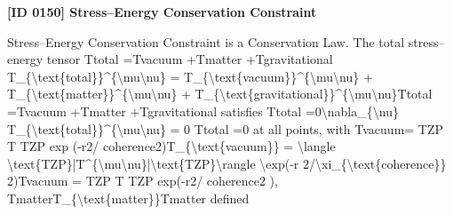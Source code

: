 \clearpage
\noindent\textbf{[ID 0150] Stress--Energy Conservation Constraint}\par
\vspace{0.35em}
\begingroup\small
{}
Stress--Energy Conservation Constraint is a Conservation Law. The total stress--energy tensor Ttotal  =Tvacuum  +Tmatter  +Tgravitational  T\_\{\textbackslash{}text\{total\}\}\textasciicircum{}\{\textbackslash{}mu\textbackslash{}nu\} = T\_\{\textbackslash{}text\{vacuum\}\}\textasciicircum{}\{\textbackslash{}mu\textbackslash{}nu\} + T\_\{\textbackslash{}text\{matter\}\}\textasciicircum{}\{\textbackslash{}mu\textbackslash{}nu\} + T\_\{\textbackslash{}text\{gravitational\}\}\textasciicircum{}\{\textbackslash{}mu\textbackslash{}nu\}Ttotal   =Tvacuum   +Tmatter   +Tgravitational   satisfies   Ttotal  =0\textbackslash{}nabla\_\{\textbackslash{}nu\} T\_\{\textbackslash{}text\{total\}\}\textasciicircum{}\{\textbackslash{}mu\textbackslash{}nu\} = 0   Ttotal   =0 at all points, with Tvacuum= TZP T   TZP exp (-r2/ coherence2)T\_\{\textbackslash{}text\{vacuum\}\} = \textbackslash{}langle \textbackslash{}text\{TZP\}|T\textasciicircum{}\{\textbackslash{}mu\textbackslash{}nu\}|\textbackslash{}text\{TZP\}\textbackslash{}rangle \textbackslash{}exp(-r 2/\textbackslash{}xi\_\{\textbackslash{}text\{coherence\}\} 2)Tvacuum = TZP T   TZP exp(-r2/ coherence2 ), TmatterT\_\{\textbackslash{}text\{matter\}\}Tmatter defined

